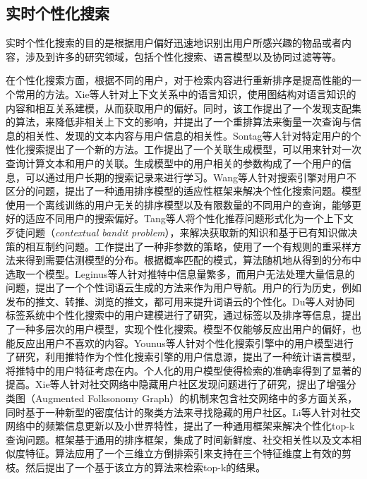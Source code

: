 \subsection{实时个性化搜索}
\label{subsec1:realTimeSearch}
实时个性化搜索的目的是根据用户偏好迅速地识别出用户所感兴趣的物品或者内容，涉及到许多的研究领域，包括个性化搜索、语言模型以及协同过滤等等。

在个性化搜索方面，根据不同的用户，对于检索内容进行重新排序是提高性能的一个常用的方法。Xie等人针对上下文关系中的语言知识，使用图结构对语言知识的内容和相互关系建模，从而获取用户的偏好。同时，该工作提出了一个发现支配集的算法，来降低非相关上下文的影响，并提出了一个重排算法来衡量一次查询与信息的相关性、发现的文本内容与用户信息的相关性。Sontag等人针对特定用户的个性化搜索提出了一个新的方法。工作提出了一个关联生成模型，可以用来针对一次查询计算文本和用户的关联。生成模型中的用户相关的参数构成了一个用户的信息，可以通过用户长期的搜索记录来进行学习。Wang等人针对搜索引擎对用户不区分的问题，提出了一种通用排序模型的适应性框架来解决个性化搜索问题。模型使用一个离线训练的用户无关的排序模型以及有限数量的不同用户的查询，能够更好的适应不同用户的搜索偏好。Tang等人将个性化推荐问题形式化为一个上下文歹徒问题（\textit{contextual bandit problem}），来解决获取新的知识和基于已有知识做决策的相互制约问题。工作提出了一种非参数的策略，使用了一个有规则的重采样方法来得到需要估测模型的分布。根据概率匹配的模式，算法随机地从得到的分布中选取一个模型。Leginus等人针对推特中信息量繁多，而用户无法处理大量信息的问题，提出了一个个性词语云生成的方法来作为用户导航。用户的行为历史，例如发布的推文、转推、浏览的推文，都可用来提升词语云的个性化。Du等人对协同标签系统中个性化搜索中的用户建模进行了研究，通过标签以及排序等信息，提出了一种多层次的用户模型，实现个性化搜索。模型不仅能够反应出用户的偏好，也能反应出用户不喜欢的内容。Younus等人针对个性化搜索引擎中的用户模型进行了研究，利用推特作为个性化搜索引擎的用户信息源，提出了一种统计语言模型，将推特中的用户特征考虑在内。个人化的用户模型使得检索的准确率得到了显著的提高。Xie等人针对社交网络中隐藏用户社区发现问题进行了研究，提出了增强分类图（Augmented Folksonomy Graph）的机制来包含社交网络中的多方面关系，同时基于一种新型的密度估计的聚类方法来寻找隐藏的用户社区。Li等人针对社交网络中的频繁信息更新以及小世界特性，提出了一种通用框架来解决个性化top-k查询问题。框架基于通用的排序框架，集成了时间新鲜度、社交相关性以及文本相似度特征。算法应用了一个三维立方倒排索引来支持在三个特征维度上有效的剪枝。然后提出了一个基于该立方的算法来检索top-k的结果。

